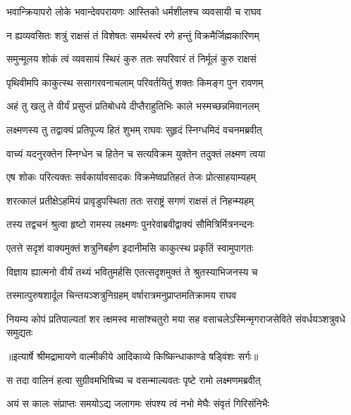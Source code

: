 \twolineshloka
{भवान्क्रियापरो लोके भवान्देवपरायणः}
{आस्तिको धर्मशीलश्च व्यवसायी च राघव} %

\twolineshloka
{न ह्यव्यवसितः शत्रुं राक्षसं तं विशेषतः}
{समर्थस्त्वं रणे हन्तुं विक्रमैर्जिह्मकारिणम्} %

\twolineshloka
{समुन्मूलय शोकं त्वं व्यवसायं स्थिरं कुरु}
{ततः सपरिवारं तं निर्मूलं कुरु राक्षसं} %

\twolineshloka
{पृथिवीमपि काकुत्स्थ ससागरवनाचलाम्}
{परिवर्तयितुं शक्तः किमङ्ग पुन रावणम्} %

\twolineshloka
{अहं तु खलु ते वीर्यं प्रसुप्तं प्रतिबोधये}
{दीप्तैराहुतिभिः काले भस्मच्छन्नमिवानलम्} %

\twolineshloka
{लक्ष्मणस्य तु तद्वाक्यं प्रतिपूज्य हितं शुभम्}
{राघवः सुहृदं स्निग्धमिदं वचनमब्रवीत्} %

\twolineshloka
{वाच्यं यदनुरक्तेन स्निग्धेन च हितेन च}
{सत्यविक्रम युक्तेन तदुक्तं लक्ष्मण त्वया} %

\twolineshloka
{एष शोकः परित्यक्तः सर्वकार्यावसादकः}
{विक्रमेष्वप्रतिहतं तेजः प्रोत्साहयाम्यहम्} %

\twolineshloka
{शरत्कालं प्रतीक्षेऽहमियं प्रावृडुपस्थिता}
{ततः सराष्ट्रं सगणं राक्षसं तं निहन्म्यहम्} %

\twolineshloka
{तस्य तद्वचनं श्रुत्वा हृष्टो रामस्य लक्ष्मणः}
{पुनरेवाब्रवीद्वाक्यं सौमित्रिर्मित्रनन्दनः} %

\twolineshloka
{एतत्ते सदृशं वाक्यमुक्तं शत्रुनिबर्हण}
{इदानीमसि काकुत्स्थ प्रकृतिं स्वामुपागतः} %

\twolineshloka
{विज्ञाय ह्यात्मनो वीर्यं तथ्यं भवितुमर्हसि}
{एतत्सदृशमुक्तं ते श्रुतस्याभिजनस्य च} %

\twolineshloka
{तस्मात्पुरुषशार्दूल चिन्तयञ्शत्रुनिग्रहम्}
{वर्षारात्रमनुप्राप्तमतिक्रामय राघव} %

\fourlineindentedshloka
{नियम्य कोपं प्रतिपाल्यतां शर}
{त्क्षमस्व मासांश्चतुरो मया सह}
{वसाचलेऽस्मिन्मृगराजसेविते}
{ संवर्धयञ्शत्रुवधे समुद्यतः} %


{॥इत्यार्षे श्रीमद्रामायणे वाल्मीकीये आदिकाव्ये किष्किन्धाकाण्डे षड्विंशः सर्गः॥}


\twolineshloka
{स तदा वालिनं हत्वा सुग्रीवमभिषिच्य च}
{वसन्माल्यवतः पृष्टे रामो लक्ष्मणमब्रवीत्} %

\twolineshloka
{अयं स कालः संप्राप्तः समयोऽद्य जलागमः}
{संपश्य त्वं नभो मेघैः संवृतं गिरिसंनिभैः} %


